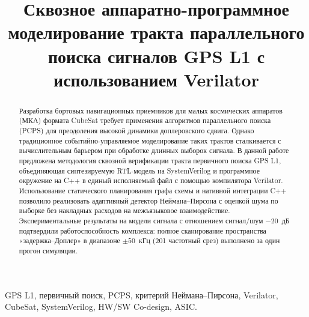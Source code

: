 \documentclass[conference]{IEEEtran}
\begin{document}
\title{Сквозное аппаратно-программное моделирование тракта параллельного поиска сигналов GPS L1 с использованием Verilator}

\author{
}

\maketitle

\begin{abstract}
Разработка бортовых навигационных приемников для малых космических аппаратов (МКА) формата CubeSat требует применения алгоритмов параллельного поиска (PCPS) для преодоления высокой динамики доплеровского сдвига. Однако традиционное событийно-управляемое моделирование таких трактов сталкивается с вычислительным барьером при обработке длинных выборок сигнала. В данной работе предложена методология сквозной верификации тракта первичного поиска GPS L1, объединяющая синтезируемую RTL-модель на SystemVerilog и программное окружение на C++ в единый исполняемый файл с помощью компилятора Verilator. Использование статического планирования графа схемы и нативной интеграции C++ позволило реализовать адаптивный детектор Неймана--Пирсона с оценкой шума по выборке без накладных расходов на межъязыковое взаимодействие. Экспериментальные результаты на модели сигнала с отношением сигнал/шум $-20$~дБ подтвердили работоспособность комплекса: полное сканирование пространства «задержка--Доплер» в диапазоне $\pm50$~кГц (201 частотный срез) выполнено за один прогон симуляции.
\end{abstract}

\begin{IEEEkeywords}
GPS L1, первичный поиск, PCPS, критерий Неймана--Пирсона, Verilator, CubeSat, SystemVerilog, HW/SW Co-design, ASIC.
\end{IEEEkeywords}









\end{document}
